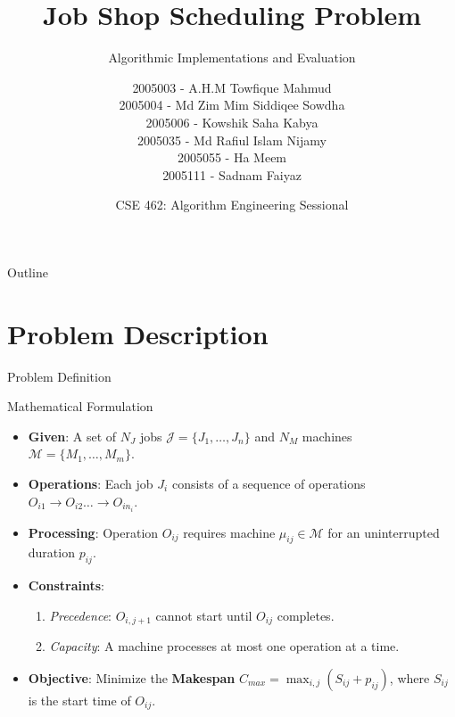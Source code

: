 \documentclass{beamer}
\title[Job Shop Scheduling Problem]{\textbf{Job Shop Scheduling Problem}}
\subtitle{Algorithmic Implementations and Evaluation}
\author[CSE 462 Team]{
    2005003 - A.H.M Towfique Mahmud \\
    2005004 - Md Zim Mim Siddiqee Sowdha \\
    2005006 - Kowshik Saha Kabya \\
    2005035 - Md Rafiul Islam Nijamy \\
    2005055 - Ha Meem \\
    2005111 - Sadnam Faiyaz
}
\date[\today]{CSE 462: Algorithm Engineering Sessional}
\begin{document}
\begin{frame}
    \titlepage
\end{frame}

\begin{frame}{Outline}
    \tableofcontents
\end{frame}

\section{Problem Description}

\begin{frame}{Problem Definition}

    \begin{block}{Mathematical Formulation}
        \begin{itemize}[<+->]
            \item \textbf{Given}: A set of $N_J$ jobs $\mathcal{J} = \{J_1, \dots, J_n\}$ and $N_M$ machines $\mathcal{M} = \{M_1, \dots, M_m\}$.
            \item \textbf{Operations}: Each job $J_i$ consists of a sequence of operations $O_{i1} \to O_{i2} \dots \to O_{in_i}$.
            \item \textbf{Processing}: Operation $O_{ij}$ requires machine $\mu_{ij} \in \mathcal{M}$ for an uninterrupted duration $p_{ij}$.
            \item \textbf{Constraints}: 
            \begin{enumerate}
                \item \textit{Precedence}: $O_{i,j+1}$ cannot start until $O_{ij}$ completes.
                \item \textit{Capacity}: A machine processes at most one operation at a time.
            \end{enumerate}
            \item \textbf{Objective}: Minimize the \textbf{Makespan} $C_{max} = \max_{i,j} (S_{ij} + p_{ij})$, where $S_{ij}$ is the start time of $O_{ij}$.
        \end{itemize}
    \end{block}
\end{frame}
\end{document}
